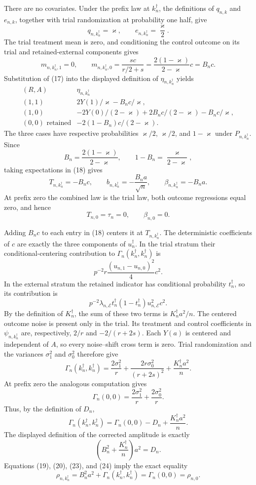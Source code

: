 There are no covariates.  Under the prefix law at \(k_n^{\dagger}\), the definitions of \(q_{n,k}\) and \(e_{n,k}\), together with trial randomization at probability one half, give
\[
 q_{n,k_n^{\dagger}}=\varkappa,
 \qquad e_{n,k_n^{\dagger}}=\frac{\varkappa}{2}.
\]
The trial treatment mean is zero, and conditioning the control outcome on its trial and retained-external components gives
\[
 m_{n,k_n^{\dagger},1}=0,
 \qquad
 m_{n,k_n^{\dagger},0}
 =\frac{sc}{r/2+s}
 =\frac{2(1-\varkappa)}{2-\varkappa}c
 =B_nc.
\tag{17}
\]
Substitution of (17) into the displayed definition of \(\eta_{n,k_n^{\dagger}}\) yields
\[
\begin{array}{c|c}
(R,A)&\eta_{n,k_n^{\dagger}}\\ \hline
(1,1)&2Y(1)/\varkappa-B_nc/\varkappa,\\
(1,0)&-2Y(0)/(2-\varkappa)+2B_nc/(2-\varkappa)-B_nc/\varkappa,\\
(0,0)\text{ retained}&-2(1-B_n)c/(2-\varkappa).
\end{array}
\tag{18}
\]
The three cases have respective probabilities \(\varkappa/2\), \(\varkappa/2\), and \(1-\varkappa\) under \(P_{n,k_n^{\dagger}}\).  Since
\[
 B_n=\frac{2(1-\varkappa)}{2-\varkappa},
 \qquad 1-B_n=\frac{\varkappa}{2-\varkappa},
\]
taking expectations in (18) gives
\[
 T_{n,k_n^{\dagger}}=-B_nc,
 \qquad
 b_{n,k_n^{\dagger}}=-\frac{B_na}{\sqrt n},
 \qquad
 \beta_{n,k_n^{\dagger}}=-B_na.
\tag{19}
\]
At prefix zero the combined law is the trial law, both outcome regressions equal zero, and hence
\[
 T_{n,0}=\tau_n=0,\qquad \beta_{n,0}=0.
\tag{20}
\]

Adding \(B_nc\) to each entry in (18) centers it at \(T_{n,k_n^{\dagger}}\).  The deterministic coefficients of \(c\) are exactly the three components of \(u_n^{\dagger}\).  In the trial stratum their conditional-centering contribution to \(\Gamma_n(k_n^{\dagger},k_n^{\dagger})\) is
\[
 p^{-2}r\frac{(u_{n,1}-u_{n,0})^2}{4}c^2.
\]
In the external stratum the retained indicator has conditional probability \(t_n^{\dagger}\), so its contribution is
\[
 p^{-2}\lambda_{n,\mathcal E}t_n^{\dagger}(1-t_n^{\dagger})u_{n,\mathcal E}^2c^2.
\]
By the definition of \(K_n^{\dagger}\), the sum of these two terms is \(K_n^{\dagger}a^2/n\).  The centered outcome noise is present only in the trial.  Its treatment and control coefficients in \(\psi_{n,k_n^{\dagger}}\) are, respectively, \(2/r\) and \(-2/(r+2s)\).  Each \(Y(a)\) is centered and independent of \(A\), so every noise--shift cross term is zero.  Trial randomization and the variances \(\sigma_1^2\) and \(\sigma_0^2\) therefore give
\[
 \Gamma_n(k_n^{\dagger},k_n^{\dagger})
 =\frac{2\sigma_1^2}{r}
  +\frac{2r\sigma_0^2}{(r+2s)^2}
  +\frac{K_n^{\dagger}a^2}{n}.
\tag{21}
\]
At prefix zero the analogous computation gives
\[
 \Gamma_n(0,0)=\frac{2\sigma_1^2}{r}+\frac{2\sigma_0^2}{r}.
\tag{22}
\]
Thus, by the definition of \(D_n\),
\[
 \Gamma_n(k_n^{\dagger},k_n^{\dagger})
 =\Gamma_n(0,0)-D_n+\frac{K_n^{\dagger}a^2}{n}.
\tag{23}
\]
The displayed definition of the corrected amplitude is exactly
\[
 \left(B_n^2+\frac{K_n^{\dagger}}n\right)a^2=D_n.
\tag{24}
\]
Equations (19), (20), (23), and (24) imply the exact equality
\[
 \rho_{n,k_n^{\dagger}}
 =B_n^2a^2+\Gamma_n(k_n^{\dagger},k_n^{\dagger})
 =\Gamma_n(0,0)
 =\rho_{n,0}.
\tag{25}
\]

